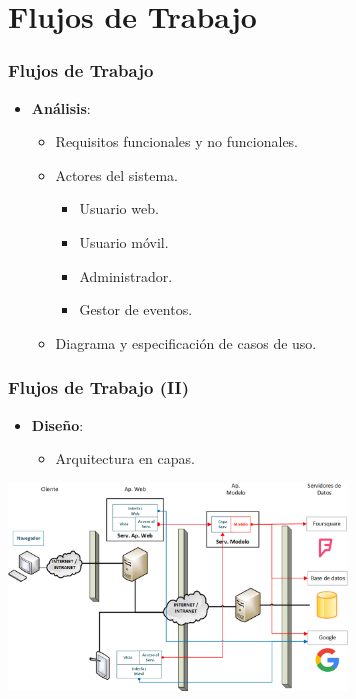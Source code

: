 \documentclass[usenames,dvipsnames]{beamer}
\begin{document}
\section{Flujos de Trabajo}
\begin{frame}
\frametitle{Flujos de Trabajo}
\begin{itemize}
\item \textbf{Análisis}:
	\begin{itemize}
		\item Requisitos funcionales y no funcionales.
		\item Actores del sistema.
			\begin{itemize}
				\item Usuario web.
				\item Usuario móvil.
				\item Administrador.
				\item Gestor de eventos.
			\end{itemize}
		\item Diagrama y especificación de casos de uso.
	\end{itemize}
\end{itemize}
\end{frame}

\begin{frame}
\frametitle{Flujos de Trabajo (II)}
\begin{itemize}
\item \textbf{Diseño}:
	\begin{itemize}
		\item Arquitectura en capas.
	\end{itemize}
\end{itemize}

\centering
\includegraphics[width=9cm]{./img/arqsistema.png}
\end{frame}
\end{document}
